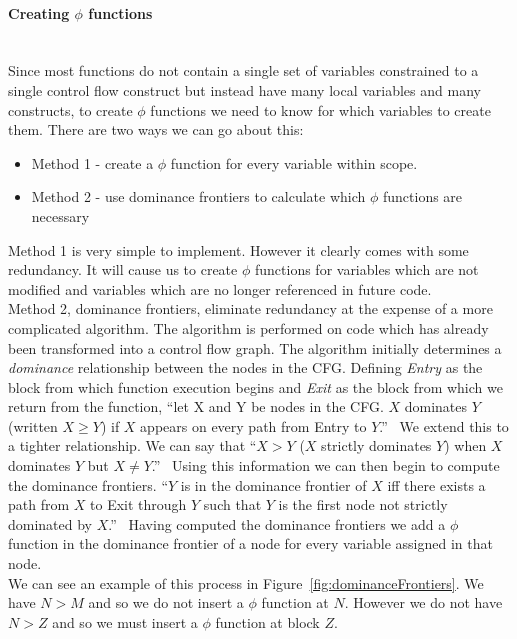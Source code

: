 \documentclass[12pt, titlepage]{article}
\begin{document}
\paragraph*{Creating $\phi$ functions}\mbox{} \\
Since most functions do not contain a single set of variables constrained to a single control flow construct but instead have many local variables and many constructs, to create $\phi$ functions we need to know for which variables to create them. There are two ways we can go about this:
\begin{itemize}
	\item Method 1 - create a $\phi$ function for every variable within scope.
	\item Method 2 - use dominance frontiers to calculate which $\phi$ functions are necessary
\end{itemize}
Method 1 is very simple to implement. However it clearly comes with some redundancy. It will cause us to create $\phi$ functions for variables which are not modified and variables which are no longer referenced in future code. \\
\indent Method 2, dominance frontiers, eliminate redundancy at the expense of a more complicated algorithm. The algorithm is performed on code which has already been transformed into a control flow graph. The algorithm initially determines a \textit{dominance} relationship between the nodes in the CFG. Defining \textit{Entry} as the block from which function execution begins and \textit{Exit} as the block from which we return from the function, ``let X and Y be nodes in the CFG. $X$ dominates $Y$ (written $X≥Y$) if $X$ appears on every path from Entry to $Y$.''~\cite{ssaLecture} We extend this to a tighter relationship. We can say that ``$X>Y$ ($X$ strictly dominates $Y$) when $X$ dominates $Y$ but $X \neq Y$.''~\cite{ssaLecture} Using this information we can then begin to compute the dominance frontiers. ``$Y$ is in the dominance frontier of $X$ iff there exists a path from $X$ to Exit through $Y$ such that $Y$ is the first node not strictly dominated by $X$.''~\cite{ssaLecture} Having computed the dominance frontiers we add a $\phi$ function in the dominance frontier of a node for every variable assigned in that node. \\
\indent We can see an example of this process in Figure~\ref{fig:dominanceFrontiers}. We have $N>M$ and so we do not insert a $\phi$ function at $N$. However we do not have $N>Z$ and so we must insert a $\phi$ function at block $Z$. \\
\end{document}
